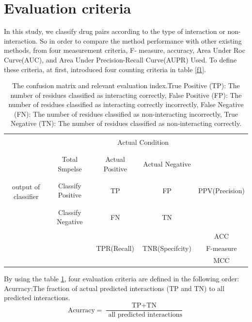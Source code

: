 \documentclass{bmcart}
\begin{document}
\section*{Evaluation criteria}
In this study, we classify drug pairs according to the type of interaction or non-interaction. So in order to compare the method performance with other existing methods, from four measurement criteria, F- measure, accuracy, Area Under Roc Curve(AUC), and Area Under Precision-Recall Curve(AUPR) Used. To define these criteria, at first, introduced four counting criteria in table
\ref {f1}.

\begin{table}[h!]
\centering
\begin{tabular}{|c|c|c|c|c|}
\hline
\multicolumn{2}{|c}{}&\multicolumn{2}{|c|}{}&\\
\multicolumn{2}{|c}{}&\multicolumn{2}{|c|}{Actual Condition}&\\
\multicolumn{2}{|c}{}&\multicolumn{2}{|c|}{}&\\
\cline{1-5}
&&&&\\
&Total Smpelse & Actual Positive & Actual Negative&\\
&&&&\\
\cline{1-5}
&&&&\\
\multirow{2}{*}{output of classifier} &Classify Positive & TP & FP&PPV(Precision)\\
&&&&\\
\cline{2-5}
&&&&\\
&Classify Negative & FN & TN&\\
&&&&\\
\cline{1-5}
&&&&ACC\\
\cline{5-5}
&&TPR(Recall) & TNR(Specifcity) & F-measure \\
\cline{5-5}
&&&&MCC\\
\cline{1-5}
\end{tabular}
\newline
	\caption{The confusion matrix and relevant evaluation index.True Positive (TP): The number of residues classified as interacting correctly, False Positive (FP): The number of residues classified as interacting correctly incorrectly, False Negative (FN): The number of residues classified as non-interacting incorrectly, True Negative (TN): The number of residues classified as non-interacting correctly.}
	\label{Table1}
\end{table}

By using the table
\ref{Table1}, four evaluation criteria are defined in the following order:
Acurracy:The fraction of actual predicted interactions (TP and TN) to all predicted interactions.
$$ \mbox{Acurracy} =  \frac{ \mbox{TP} + \mbox{TN}}{\mbox{ all predicted interactions}} $$
\end{document}
